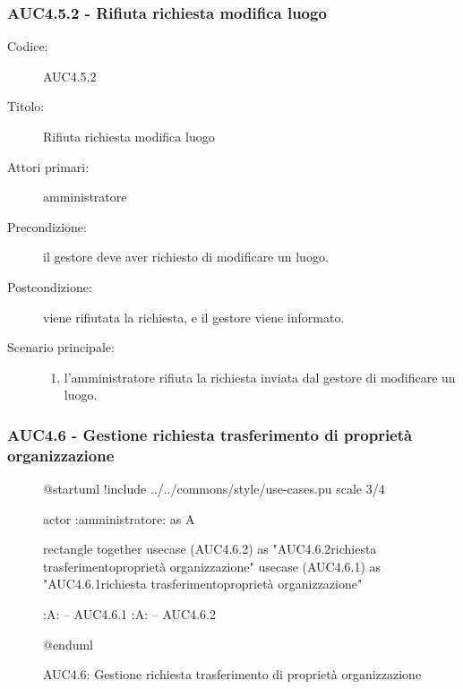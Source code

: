 \documentclass[casi-duso]{subfiles}
\begin{document}
\subsubsection{AUC4.5.2 - Rifiuta richiesta modifica luogo}%
\label{subsub:AUC4.5.2}
\begin{description}
  \item[Codice:] AUC4.5.2
  \item[Titolo:] Rifiuta richiesta modifica luogo
  \item[Attori primari:] amministratore
  \item[Precondizione:] il gestore deve aver richiesto di modificare un luogo.
  \item[Postcondizione:] viene rifiutata la richiesta, e il gestore viene informato.
  \item[Scenario principale:]
  \begin{enumerate}
    \item l'amministratore rifiuta la richiesta inviata dal gestore di modificare un luogo.
  \end{enumerate}
\end{description}

\subsubsection{AUC4.6 - Gestione richiesta trasferimento di proprietà organizzazione}%
\label{subsub:AUC4.6}

\begin{figure}[h!] 
  \centering 
  \begin{plantuml}
  @startuml
  !include ../../commons/style/use-cases.pu
  scale 3/4

  actor :amministratore: as A

  rectangle {
    together {
      usecase (AUC4.6.2) as "AUC4.6.2\nRifiuta richiesta trasferimento\ndi proprietà organizzazione"
      usecase (AUC4.6.1) as "AUC4.6.1\nAccetta richiesta trasferimento\ndi proprietà organizzazione"
    }
  }

  :A: -- AUC4.6.1
  :A: -- AUC4.6.2

  @enduml
  \end{plantuml} 
  \caption{AUC4.6: Gestione richiesta trasferimento di proprietà organizzazione}
  \label{fig:auc4_6} 
\end{figure}
\end{document}
